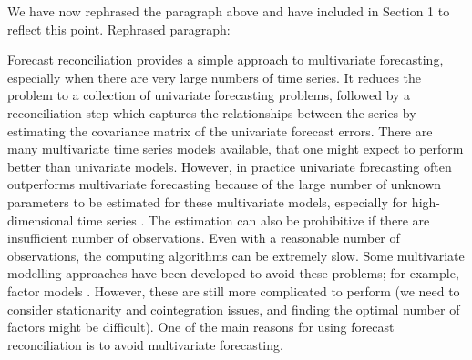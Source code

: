 \documentclass[10pt,a4paper]{article}
\begin{document}
\begin{enumerate}
	{\color{blue} We have now rephrased the paragraph above and have included in Section 1 to reflect this point. Rephrased paragraph:
		
	Forecast reconciliation provides a simple approach to multivariate forecasting, especially when there are very large numbers of time series. It reduces the problem to a collection of univariate forecasting problems, followed by a reconciliation step  which captures the relationships between the series by estimating the covariance matrix of the univariate forecast errors. There are many multivariate time series models available, that one might expect to perform better than univariate models. However, in practice univariate forecasting often outperforms multivariate forecasting because of the large number of unknown parameters to be estimated for these multivariate models, especially for high-dimensional time series \citep{Chatfield2000}. The estimation can also be prohibitive if there are insufficient number of observations. Even with a reasonable number of observations, the computing algorithms can be extremely slow. Some multivariate modelling approaches have been developed to avoid these problems; for example, factor models \citep[see][Econometrica]{Bai2003}. However, these are still more complicated to perform (we need to consider stationarity and cointegration issues, and finding the optimal number of factors might be difficult). One of the main reasons for using forecast reconciliation is to avoid multivariate forecasting.}
\end{enumerate}

\printbibliography
\end{document}
